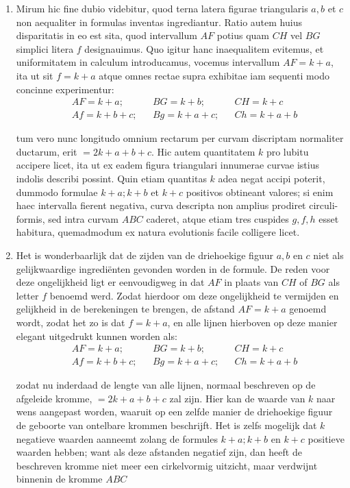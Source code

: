 \documentclass[10pt,a4paper]{article}
\newcommand{\switchenum}{\setcounter{enumi}{\arabic{enumi}-1}\switchcolumn}
\begin{document}
\begin{paracol}{2}
\begin{enumerate}[topsep=1px]
		\switchcolumn*
		
		\item Mirum hic fine dubio videbitur, quod terna latera figurae triangularis $a,b$ et $c$ non aequaliter in formulas inventas ingrediantur. Ratio autem huius disparitatis in eo est sita, quod intervallum $AF$ potius quam $CH$ vel $BG$ simplici litera $f$ designauimus. Quo igitur hanc inaequalitem evitemus, et uniformitatem in calculum introducamus, vocemus intervallum $AF = k+a$, ita ut sit $f=k+a$ atque omnes rectae supra exhibitae iam sequenti modo concinne experimentur:
		\begin{align*}
			&AF = k+a;  &&BG = k+b;   &&CH = k+c\\
			&Af = k+b+c;  &&Bg = k+a+c; &&Ch = k+a+b
		\end{align*}
		
		\par tum vero nunc longitudo omnium rectarum per curvam discriptam normaliter ductarum, erit $= 2k+a+b+c$. Hic autem quantitatem $k$ pro lubitu accipere licet, ita ut ex eadem figura triangulari innumerae curvae istius indolis describi possint. Quin etiam quantitas $k$ adea negat accipi poterit, dummodo formulae $k+a; k+b$ et $k+c$ positivos obtineant valores; si enim haec intervalla fierent negativa, curva descripta non amplius prodiret circuli-formis, sed intra curvam $ABC$ caderet, atque etiam tres cuspides $g,f,h$ esset habitura, quemadmodum ex natura evolutionis facile colligere licet.
		
		\switchenum
		\item Het is wonderbaarlijk dat de zijden van de driehoekige figuur $a,b$ en $c$ niet als gelijkwaardige ingrediënten gevonden worden in de formule. De reden voor deze ongelijkheid ligt er eenvoudigweg in dat $AF$ in plaats van $CH$ of $BG$ als letter $f$ benoemd werd. Zodat hierdoor om deze ongelijkheid te vermijden en gelijkheid in de berekeningen te brengen, de afstand $AF= k+a$ genoemd wordt, zodat het zo is dat $f=k+a$, en alle lijnen hierboven op deze manier elegant uitgedrukt kunnen worden als:
		\begin{align*}
			&AF = k+a;  &&BG = k+b;   &&CH = k+c\\
			&Af = k+b+c;  &&Bg = k+a+c; &&Ch = k+a+b
		\end{align*}
		\par zodat nu inderdaad de lengte van alle lijnen, normaal beschreven op de afgeleide kromme, $=2k+a+b+c$ zal zijn. Hier kan de waarde van $k$ naar wens aangepast worden, waaruit op een zelfde manier de driehoekige figuur de geboorte van ontelbare krommen beschrijft. Het is zelfs mogelijk dat $k$ negatieve waarden aanneemt zolang de formules $k+a; k+b$ en $k+c$ positieve waarden hebben; want als deze afstanden negatief zijn, dan heeft de beschreven kromme niet meer een cirkelvormig uitzicht, maar verdwijnt binnenin de kromme $ABC$
		

\end{enumerate}
\end{paracol}
\end{document}

